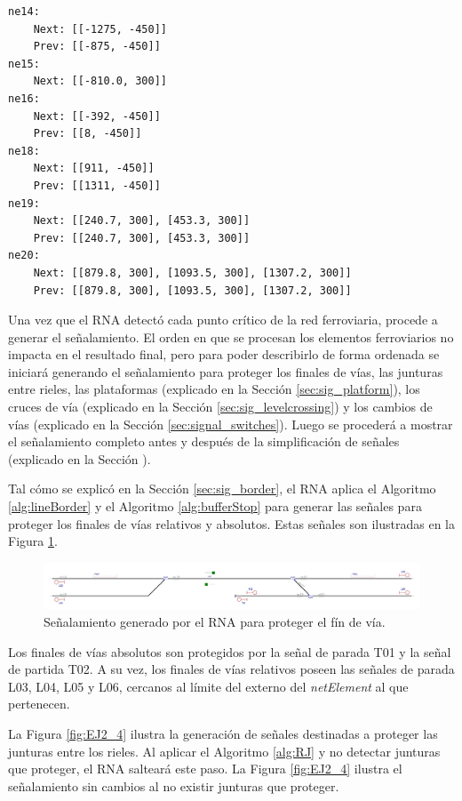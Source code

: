 	\begin{lstlisting}[language = {}, caption = SafePoints.RNA, label = {lst:EJ2_5}]
ne14:
	Next: [[-1275, -450]]
	Prev: [[-875, -450]]
ne15:
	Next: [[-810.0, 300]]
ne16:
	Next: [[-392, -450]]
	Prev: [[8, -450]]
ne18:
	Next: [[911, -450]]
	Prev: [[1311, -450]]
ne19:
	Next: [[240.7, 300], [453.3, 300]]
	Prev: [[240.7, 300], [453.3, 300]]
ne20:
	Next: [[879.8, 300], [1093.5, 300], [1307.2, 300]]
	Prev: [[879.8, 300], [1093.5, 300], [1307.2, 300]]
	\end{lstlisting}	
	
	Una vez que el RNA detectó cada punto crítico de la red ferroviaria, procede a generar el señalamiento. El orden en que se procesan los elementos ferroviarios no impacta en el resultado final, pero para poder describirlo de forma ordenada se iniciará generando el señalamiento para proteger los finales de vías, las junturas entre rieles, las plataformas (explicado en la Sección \ref{sec:sig_platform}), los cruces de vía (explicado en la Sección \ref{sec:sig_levelcrossing}) y los cambios de vías (explicado en la Sección \ref{sec:signal_switches}). Luego se procederá a mostrar el señalamiento completo antes y después de la simplificación de señales (explicado en la Sección \label{sec:simplificacion}). 
	
	Tal cómo se explicó en la Sección \ref{sec:sig_border}, el RNA aplica el Algoritmo \ref{alg:lineBorder} y el Algoritmo \ref{alg:bufferStop} para generar las señales para proteger los finales de vías relativos y absolutos. Estas señales son ilustradas en la Figura \ref{fig:EJ2_3}.

	\begin{figure}[H]
		\centering
		\includegraphics[width=1\textwidth]{resultados-obtenidos/ejemplo2/images/2_step1.png}
		\centering\caption{Señalamiento generado por el RNA para proteger el fín de vía.}
		\label{fig:EJ2_3}
	\end{figure}

	Los finales de vías absolutos son protegidos por la señal de parada T01 y la señal de partida T02. A su vez, los finales de vías relativos poseen las señales de parada L03, L04, L05 y L06, cercanos al límite del externo del \textit{netElement} al que pertenecen.
	
	La Figura \ref{fig:EJ2_4} ilustra la generación de señales destinadas a proteger las junturas entre los rieles. Al aplicar el Algoritmo \ref{alg:RJ} y no detectar junturas que proteger, el RNA salteará este paso. La Figura \ref{fig:EJ2_4} ilustra el señalamiento sin cambios al no existir junturas que proteger.
	
